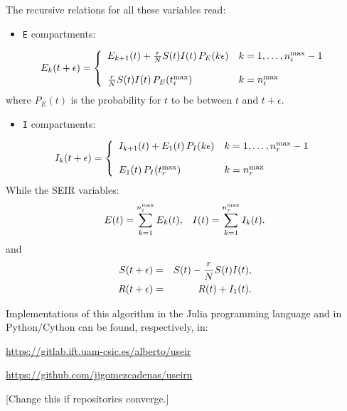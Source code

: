 \documentclass[a4paper,oneside,11pt]{article}
\newcommand{\mycomment}[1]{\textcolor[rgb]{0.75,0,0}{[#1]}}
\begin{document}
The recursive relations for all these variables read:
\begin{itemize}
\item \texttt{E} compartments:
\end{itemize}
\begin{equation}
E_k(t+\epsilon) = \left \{
\begin{array}{ll}
E_{k+1}(t) + {r\over N}S(t)I(t)\, P_E(k\epsilon) & k=1,\dots,n_i^{\rm max}-1\\
& \\
{r\over N}S(t)I(t)\, P_E(t_i^{\rm max}) & k=n^{\rm max}_i \\
\end{array}
\right.
\end{equation}
where \(P_E(t)\) is the probability for \(t\) to be between \(t\) and
\(t+\epsilon\). 
\begin{itemize}
\item \texttt{I} compartments:
\end{itemize}
\begin{equation}
I_k(t+\epsilon) = \left \{
\begin{array}{ll}
I_{k+1}(t) + E_{1}(t)\, P_I(k\epsilon) & k=1,\dots,n_r^{\rm max}-1\\
& \\
E_{1}(t)\, P_I(t_r^{\rm max}) & k=n_r^{\rm max} \\
\end{array}
\right.
\end{equation}
While the SEIR variables:
  \begin{eqnarray}
  E(t) = \sum_{k=1}^{n_i^{\rm max}} E_k(t), \;\;\;
  I(t) = \sum_{k=1}^{n_r^{\rm max}} I_k(t). 
  \end{eqnarray}
  and 
  \begin{eqnarray}
  S(t+\epsilon) &=& S(t) - {r\over N} S(t) I(t),\nonumber\\
  R(t+\epsilon) &=& R(t) + I_{1}(t). 
  \end{eqnarray}

Implementations of this algorithm in the Julia programming language and in Python/Cython can be found, respectively, in:

\vspace{2mm}
\hspace{5mm}\url{https://gitlab.ift.uam-csic.es/alberto/useir}

\hspace{5mm}\url{https://github.com/jjgomezcadenas/useirn} 


\mycomment{Change this if repositories converge.}
\end{document}
